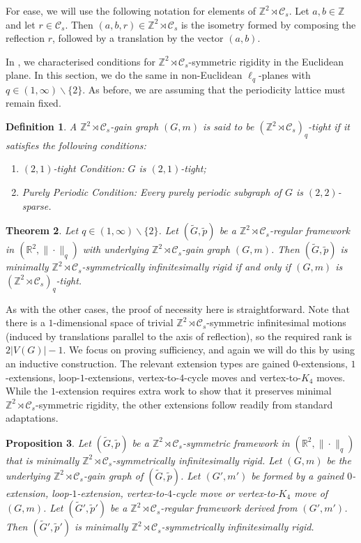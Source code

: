 \documentclass[reqno,a4paper,10pt]{article}
\newtheorem{theorem}{Theorem}[section]
\newtheorem{definition}[theorem]{Definition}
\newtheorem{proposition}[theorem]{Proposition}
\theoremstyle{definition}
\theoremstyle{remark}
\numberwithin{equation}{section}
\numberwithin{figure}{section}
\numberwithin{table}{section}
\newcommand{\R}{\mathbb{R}}
\newcommand{\Z}{\mathbb{Z}}
\newcommand{\G}{\tilde{G}}
\newcommand{\p}{\tilde{p}}
\begin{document}
    For ease, we will use the following notation for elements of $\Z^2\rtimes\mathcal{C}_s$. Let $a,b\in\Z$ and let $r\in\mathcal{C}_s$. Then $(a,b,r)\in\Z^2\rtimes\mathcal{C}_s$ is the isometry formed by composing the reflection $r$, followed by a translation by the vector $(a,b)$.
    
    In \cite[Theorem 3.2]{EssonCrystallographic}, we characterised conditions for $\Z^2\rtimes\mathcal{C}_s$-symmetric rigidity in the Euclidean plane. In this section, we do the same in non-Euclidean $\ell_q$-planes with $q\in(1,\infty)\backslash\{2\}$. As before, we are assuming that the periodicity lattice must remain fixed.
    \begin{definition}\label{DefZReflectivelq}
        A $\Z^2\rtimes\mathcal{C}_s$-gain graph $(G,m)$ is said to be \emph{$(\Z^2\rtimes\mathcal{C}_s)_q$-tight} if it satisfies the following conditions:
        \begin{enumerate}
			\item \emph{$(2,1)$-tight Condition:} $G$ is $(2,1)$-tight;
			\item \emph{Purely Periodic Condition:} Every purely periodic subgraph of $G$ is $(2,2)$-sparse.
		\end{enumerate}
    \end{definition}
       \begin{theorem}\label{ZReflectivelq}
        Let $q\in(1,\infty)\backslash\{2\}$. Let $(\G,\p)$ be a $\Z^2\rtimes\mathcal{C}_s$-regular framework in $(\R^2,\|\cdot\|_q)$ with underlying $\Z^2\rtimes\mathcal{C}_s$-gain graph $(G,m)$. Then $(\G,\p)$ is minimally $\Z^2\rtimes\mathcal{C}_s$-symmetrically infinitesimally rigid if and only if $(G,m)$ is $(\Z^2\rtimes\mathcal{C}_s)_q$-tight.
    \end{theorem}
    As with the other cases, the proof of necessity here is straightforward. Note that there is a $1$-dimensional space of trivial $\Z^2\rtimes\mathcal{C}_s$-symmetric infinitesimal motions (induced by translations parallel to the axis of reflection), so the required rank is $2|V(G)|-1$. We focus on proving sufficiency, and again we will do this by using an inductive construction.
    The relevant extension types are gained $0$-extensions, $1$-extensions, loop-$1$-extensions, vertex-to-$4$-cycle moves and vertex-to-$K_4$ moves. While the $1$-extension requires extra work to show that it preserves minimal $\Z^2\rtimes\mathcal{C}_s$-symmetric rigidity, the other extensions follow readily from standard adaptations.
    \begin{proposition}\label{LqZCsMostExtensions}
		Let $(\G,\p)$ be a $\Z^2\rtimes\mathcal{C}_s$-symmetric framework in $(\R^2,\|\cdot\|_q)$ that is minimally $\Z^2\rtimes\mathcal{C}_s$-symmetrically infinitesimally rigid. Let $(G,m)$ be the underlying $\Z^2\rtimes\mathcal{C}_s$-gain graph of $(\G,\p)$. Let $(G',m')$ be formed by a gained $0$-extension, loop-$1$-extension, vertex-to-$4$-cycle move or vertex-to-$K_4$ move of $(G,m)$. Let $(\G',\p')$ be a $\Z^2\rtimes\mathcal{C}_s$-regular framework derived from $(G',m')$. Then $(\G',\p')$ is minimally $\Z^2\rtimes\mathcal{C}_s$-symmetrically infinitesimally rigid. 
	\end{proposition}
\end{document}
